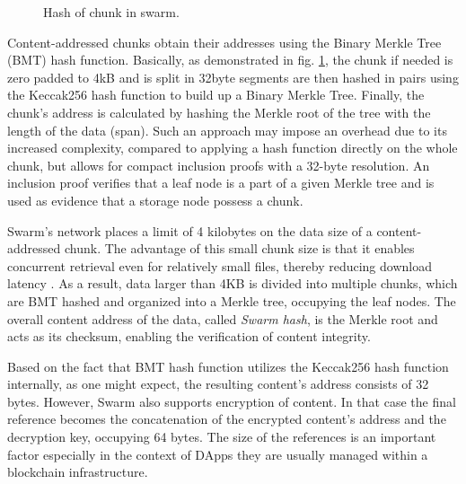 \begin{figure}[htbp]
    \centering
    \resizebox{1\textwidth}{!}{
    }
    \caption{Hash of chunk in swarm. \citep{tron_2020}}
    \label{fig:bmt}
 \end{figure}

Content-addressed chunks obtain their addresses using the Binary Merkle Tree (BMT) hash function. Basically, as demonstrated in fig. \ref{fig:bmt}, the chunk if needed is zero padded to 4kB and is split in 32\add{-}byte segments   are then hashed in pairs using the Keccak256 hash function to build up a Binary Merkle Tree. Finally, the chunk's address is calculated by hashing the Merkle root of the tree with the length of the data (span). Such an approach may impose an overhead due to its increased complexity, compared to applying a hash function directly on the whole chunk, but allows for compact inclusion proofs with a 32-byte resolution. An inclusion proof verifies that a leaf node is a part of a given Merkle tree \citep{wikipedia_2023} and is used as evidence that a storage node possess a chunk.

Swarm's network places a limit of 4 kilobytes on the data size of a content-addressed chunk. The advantage of this small chunk size is that it enables concurrent retrieval even for relatively small files, thereby reducing download latency \citep[p.~38]{tron_2020}. As a result, data larger than 4KB is divided into multiple chunks, which are BMT hashed and organized into a Merkle tree, occupying the leaf nodes. The overall content address of the data, called \textit{Swarm hash}, is the Merkle root and acts as its checksum, enabling the verification of content integrity.

Based on the fact that  BMT hash function utilizes the Keccak256 hash function internally, as one might expect, the resulting content's address consists of 32 bytes. However, Swarm also supports encryption of content. In that case the final reference becomes the concatenation of the encrypted content's address and the decryption key, occupying 64 bytes. The size of the references is an important factor especially in the context of DApps they are usually managed within a blockchain infrastructure.

